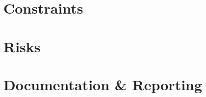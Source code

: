 \documentclass{article}
\begin{document}
\section{Constraints}


\section{Risks}


\section{Documentation \& Reporting}


\newpage

%

{}
\end{document}
